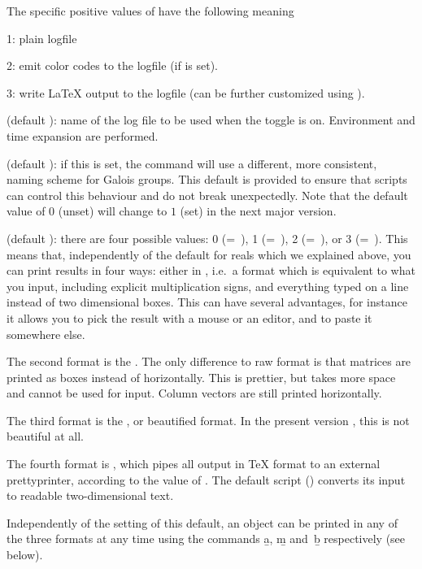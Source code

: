 The specific positive values of  have the following meaning

1: plain logfile

2: emit color codes to the logfile (if  is set).

3: write LaTeX output to the logfile (can be further customized using
).

 (default ): name of the log file to be
used when the  toggle is on. Environment and time expansion are
performed.

 (default ): if
this is set, the  command will use a different, more
consistent, naming scheme for Galois groups. This default is provided to
ensure that scripts can control this behaviour and do not break unexpectedly.
Note that the default value of $0$ (unset) will change to $1$ (set) in the
next major version.

 (default ): there are four possible values: 0
(=~), 1 (=~), 2 (=~), or 3
(=~). This
means that, independently of the default  for reals which we
explained above, you can print results in four ways: either in , i.e.~a format which is equivalent to what you input, including
explicit multiplication signs, and everything typed on a line instead of
two dimensional boxes. This can have several advantages, for instance it
allows you to pick the result with a mouse or an editor, and to paste it
somewhere else.\label{se:output}

The second format is the . The only difference to
raw format is that matrices are printed as boxes instead of horizontally.
This is prettier, but takes more space and cannot be used for input. Column
vectors are still printed horizontally.

The third format is the , or beautified format. In
the present version \vers, this is not beautiful at all.

The fourth format is , which pipes
all  output in TeX format to an external prettyprinter, according to the
value of . The default script () converts
its input to readable two-dimensional text.

Independently of the setting of this default, an object can be printed
in any of the three formats at any time using the commands \b{a}, \b{m}
and~\b{b} respectively (see below).

